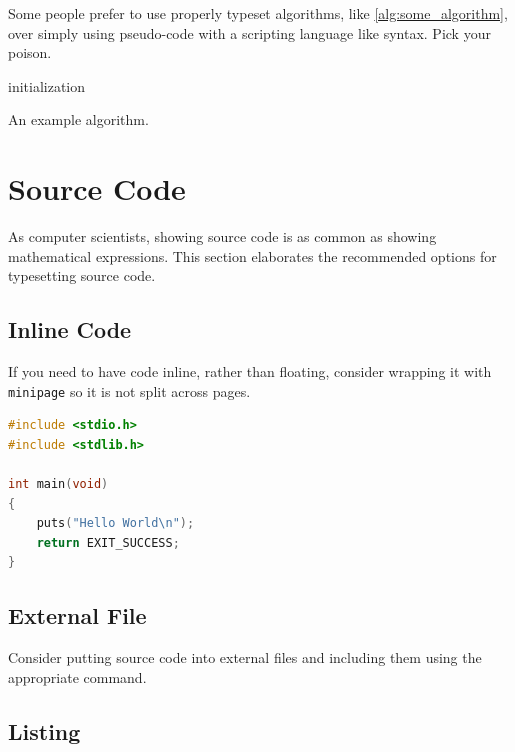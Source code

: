 Some people prefer to use properly typeset algorithms, like \cref{alg:some_algorithm}, over simply using pseudo-code with a scripting language like syntax.
Pick your poison.

\begin{algorithm}
	\capstart
	\BlankLine
	initialization\;
	\caption{An example algorithm.}
	\label{alg:some_algorithm}
\end{algorithm}

\section{Source Code}

As computer scientists, showing source code is as common as showing mathematical expressions.
This section elaborates the recommended options for typesetting source code.

\subsection{Inline Code}

If you need to have code inline, rather than floating, consider wrapping it with \texttt{minipage} so it is not split across pages.

\begin{minipage}{0.95\textwidth}
\begin{lstlisting}[language=c]
#include <stdio.h>
#include <stdlib.h>

int main(void)
{
	puts("Hello World\n");
	return EXIT_SUCCESS;
}
\end{lstlisting}
\end{minipage}

\subsection{External File}

Consider putting source code into external files and including them using the appropriate command.

\begin{minipage}{0.95\textwidth}

\end{minipage}

\subsection{Listing}

